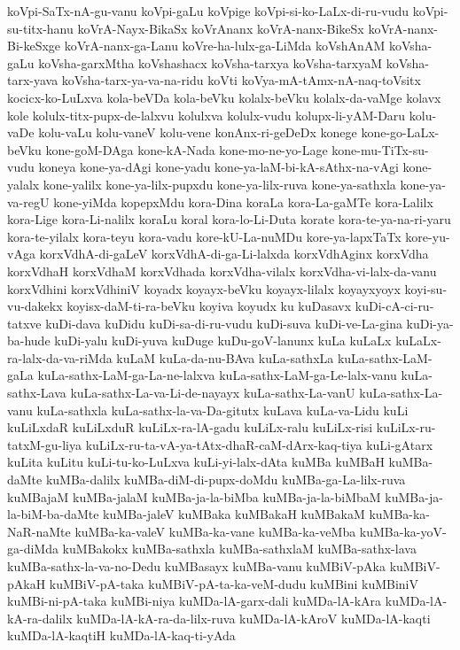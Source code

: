 {koVpi-SaTx-nA-gu-vanu
koVpi-gaLu
koVpige
koVpi-si-ko-LaLx-di-ru-vudu
koVpi-su-titx-hanu
koVrA-Nayx-BikaSx
koVrAnanx
koVrA-nanx-BikeSx
koVrA-nanx-Bi-keSxge
koVrA-nanx-ga-Lanu
koVre-ha-lulx-ga-LiMda
koVshAnAM
koVsha-gaLu
koVsha-garxMtha
koVshashacx
koVsha-tarxya
koVsha-tarxyaM
koVsha-tarx-yava
koVsha-tarx-ya-va-na-ridu
koVti
koVya-mA-tAmx-nA-naq-toVsitx
kocicx-ko-LuLxva
kola-beVDa
kola-beVku
kolalx-beVku
kolalx-da-vaMge
kolavx
kole
kolulx-titx-pupx-de-lalxvu
kolulxva
kolulx-vudu
kolupx-li-yAM-Daru
kolu-vaDe
kolu-vaLu
kolu-vaneV
kolu-vene
konAnx-ri-geDeDx
konege
kone-go-LaLx-beVku
kone-goM-DAga
kone-kA-Nada
kone-mo-ne-yo-Lage
kone-mu-TiTx-su-vudu
koneya
kone-ya-dAgi
kone-yadu
kone-ya-laM-bi-kA-sAthx-na-vAgi
kone-yalalx
kone-yalilx
kone-ya-lilx-pupxdu
kone-ya-lilx-ruva
kone-ya-sathxla
kone-ya-va-regU
kone-yiMda
kopepxMdu
kora-Dina
koraLa
kora-La-gaMTe
kora-Lalilx
kora-Lige
kora-Li-nalilx
koraLu
koral
kora-lo-Li-Duta
korate
kora-te-ya-na-ri-yaru
kora-te-yilalx
kora-teyu
kora-vadu
kore-kU-La-nuMDu
kore-ya-lapxTaTx
kore-yu-vAga
korxVdhA-di-gaLeV
korxVdhA-di-ga-Li-lalxda
korxVdhAginx
korxVdha
korxVdhaH
korxVdhaM
korxVdhada
korxVdha-vilalx
korxVdha-vi-lalx-da-vanu
korxVdhini
korxVdhiniV
koyadx
koyayx-beVku
koyayx-lilalx
koyayxyoyx
koyi-su-vu-dakekx
koyisx-daM-ti-ra-beVku
koyiva
koyudx
ku
kuDasavx
kuDi-cA-ci-ru-tatxve
kuDi-dava
kuDidu
kuDi-sa-di-ru-vudu
kuDi-suva
kuDi-ve-La-gina
kuDi-ya-ba-hude
kuDi-yalu
kuDi-yuva
kuDuge
kuDu-goV-lanunx
kuLa
kuLaLx
kuLaLx-ra-lalx-da-va-riMda
kuLaM
kuLa-da-nu-BAva
kuLa-sathxLa
kuLa-sathx-LaM-gaLa
kuLa-sathx-LaM-ga-La-ne-lalxva
kuLa-sathx-LaM-ga-Le-lalx-vanu
kuLa-sathx-Lava
kuLa-sathx-La-va-Li-de-nayayx
kuLa-sathx-La-vanU
kuLa-sathx-La-vanu
kuLa-sathxla
kuLa-sathx-la-va-Da-gitutx
kuLava
kuLa-va-Lidu
kuLi
kuLiLxdaR
kuLiLxduR
kuLiLx-ra-lA-gadu
kuLiLx-ralu
kuLiLx-risi
kuLiLx-ru-tatxM-gu-liya
kuLiLx-ru-ta-vA-ya-tAtx-dhaR-caM-dArx-kaq-tiya
kuLi-gAtarx
kuLita
kuLitu
kuLi-tu-ko-LuLxva
kuLi-yi-lalx-dAta
kuMBa
kuMBaH
kuMBa-daMte
kuMBa-dalilx
kuMBa-diM-di-pupx-doMdu
kuMBa-ga-La-lilx-ruva
kuMBajaM
kuMBa-jalaM
kuMBa-ja-la-biMba
kuMBa-ja-la-biMbaM
kuMBa-ja-la-biM-ba-daMte
kuMBa-jaleV
kuMBaka
kuMBakaH
kuMBakaM
kuMBa-ka-NaR-naMte
kuMBa-ka-valeV
kuMBa-ka-vane
kuMBa-ka-veMba
kuMBa-ka-yoV-ga-diMda
kuMBakokx
kuMBa-sathxla
kuMBa-sathxlaM
kuMBa-sathx-lava
kuMBa-sathx-la-va-no-Dedu
kuMBasayx
kuMBa-vanu
kuMBiV-pAka
kuMBiV-pAkaH
kuMBiV-pA-taka
kuMBiV-pA-ta-ka-veM-dudu
kuMBini
kuMBiniV
kuMBi-ni-pA-taka
kuMBi-niya
kuMDa-lA-garx-dali
kuMDa-lA-kAra
kuMDa-lA-kA-ra-dalilx
kuMDa-lA-kA-ra-da-lilx-ruva
kuMDa-lA-kAroV
kuMDa-lA-kaqti
kuMDa-lA-kaqtiH
kuMDa-lA-kaq-ti-yAda
}
